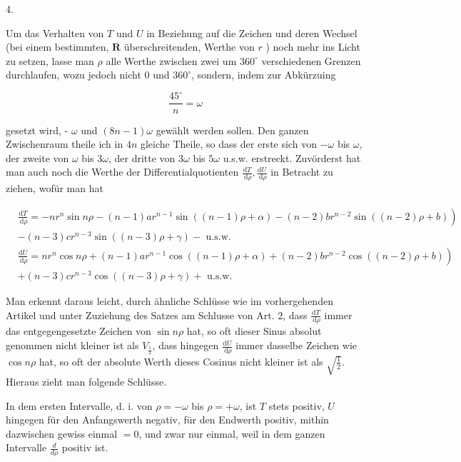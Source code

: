 \documentclass[10pt]{article}
\begin{document}
4.

Um das Verhalten von \(T\) und \(U\) in Beziehung auf die Zeichen und deren Wechsel (bei einem bestimmten, \(\boldsymbol{R}\) überschreitenden, Werthe von \(r\) ) noch mehr ins Licht zu setzen, lasse man \(\rho\) alle Werthe zwischen zwei um \(360^{\circ}\) verschiedenen Grenzen durchlaufen, wozu jedoch nicht 0 und \(360^{\circ}\), sondern, indem zur Abkürzuing

\[
\frac{45^{\circ}}{n}=\omega
\]

gesetzt wird, - \(\omega\) und \((8 n-1) \omega\) gewählt werden sollen. Den ganzen Zwischenraum theile ich in \(4 n\) gleiche Theile, so dass der erste sich von \(-\omega\) bis \(\omega\), der zweite von \(\omega\) bis \(3 \omega\), der dritte von \(3 \omega\) bis \(5 \omega\) u.s.w. erstreckt. Zuvörderst hat man auch noch die Werthe der Differentialquotienten \(\frac{\mathrm{d} T}{\mathrm{~d} \rho}, \frac{\mathrm{d} U}{\mathrm{~d} \rho}\) in Betracht zu ziehen, wofür man hat

\[
\begin{aligned}
& \left.\frac{\mathrm{d} T}{\mathrm{~d} \rho}=-n r^{n} \sin n \rho-(n-1) a r^{n-1} \sin ((n-1) \rho+\alpha)-(n-2) b r^{n-2} \sin ((n-2) \rho+b)\right) \\
& -(n-3) c r^{n-3} \sin ((n-3) \rho+\gamma)-\text { u.s.w. } \\
& \left.\frac{\mathrm{d} U}{\mathrm{~d} \rho}=n r^{n} \cos n \rho+(n-1) a r^{n-1} \cos ((n-1) \rho+\alpha)+(n-2) b r^{n-2} \cos ((n-2) \rho+b)\right) \\
& +(n-3) c r^{n-3} \cos ((n-3) \rho+\gamma)+\text { u.s.w. }
\end{aligned}
\]

Man erkennt daraus leicht, durch ähnliche Schlüsse wie im vorhergehenden Artikel und unter Zuziehung des Satzes am Schlusse von Art. 2, dass \(\frac{\mathrm{d} T}{\mathrm{~d} \rho}\) immer das entgegengesetzte Zeichen von \(\sin n \rho\) hat, so oft dieser Sinus absolut genommen nicht kleiner ist als \(V_{\frac{1}{2}}\), dass hingegen \(\frac{\mathrm{d} U}{\mathrm{~d} \rho}\) immer dasselbe Zeichen wie \(\cos n \rho\) hat, so oft der absolute Werth dieses Cosinus nicht kleiner ist als \(\sqrt{\frac{1}{2}}\). Hieraus zieht man folgende Schlüsse.

In dem ersten Intervalle, d. i. von \(\rho=-\omega\) bis \(\rho=+\omega\), ist \(T\) stets positiv, \(U\) hingegen für den Anfangswerth negativ, für den Endwerth positiv, mithin dazwischen gewiss einmal \(=0\), und zwar nur einmal, weil in dem ganzen Intervalle \(\frac{d}{d \rho}\) positiv ist.
\end{document}
